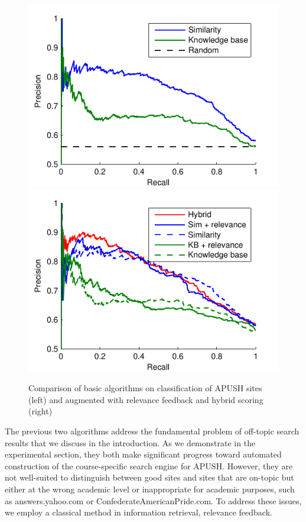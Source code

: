 \documentclass[pdfpagelabels=false,plainpages=true]{acm_proc_article-sp}
\begin{document}
\begin{figure}[t!]
\includegraphics{expt}
\includegraphics{expt_relevance}
\caption{Comparison of basic algorithms on classification of APUSH
  sites (left) and  augmented with relevance feedback and hybrid scoring (right)}
\label{fig-expt}
\end{figure}

The previous two algorithms address the fundamental problem of off-topic search
results that we discuss in the introduction. As we demonstrate in the
experimental section, they both make significant progress toward automated
construction of the course-specific search engine for APUSH. However, they are
not well-suited to distinguish between good sites and sites that are on-topic
but either at the wrong academic level or inappropriate for academic purposes,
such as answers.yahoo.com or ConfederateAmericanPride.com. To address these
issues, we employ a classical method in information retrieval, relevance feedback. 
\end{document}
